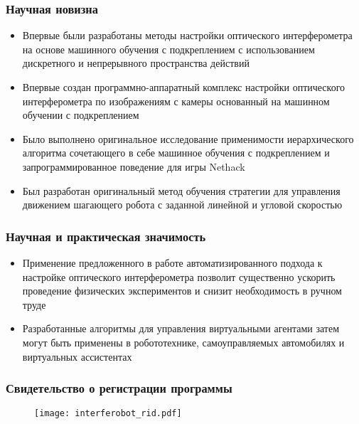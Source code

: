\begin{frame}
    \frametitle{Научная новизна}
    \begin{itemize}
        \item Впервые были разработаны методы настройки оптического интерферометра на основе машинного обучения с подкреплением с использованием дискретного и непрерывного пространства действий
        \item Впервые создан программно-аппаратный комплекс настройки оптического интерферометра по изображениям с камеры основанный на машинном обучении с подкреплением
        \item Было выполнено оригинальное исследование применимости иерархического алгоритма сочетающего в себе машинное обучения с подкреплением и запрограммированное поведение для игры Nethack
        \item Был разработан оригинальный метод обучения стратегии для управления движением шагающего робота с заданной линейной и угловой скоростью
    \end{itemize}
\end{frame}

\begin{frame}
    \frametitle{Научная и практическая значимость}
    \begin{itemize}
        \item Применение предложенного в работе автоматизированного подхода к настройке оптического интерферометра позволит существенно ускорить проведение физических экспериментов и снизит необходимость в ручном труде
        \item Разработанные алгоритмы для управления виртуальными агентами затем могут быть применены в робототехнике, самоуправляемых автомобилях и виртуальных ассистентах
    \end{itemize}
\end{frame}

\begin{frame}
    \frametitle{Свидетельство о регистрации программы}
    \begin{figure}[h]
        \centering
        \texttt{[image: interferobot\_rid.pdf]}
    \end{figure}
\end{frame}


